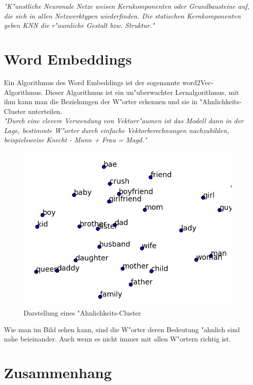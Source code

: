 \textit{"K"unstliche Neuronale Netze weisen Kernkomponenten oder Grundbausteine auf, die sich in allen Netzwerktypen wiederfinden. Die statischen Kernkomponenten geben KNN die r"aumliche Gestalt bzw. Struktur."}
\cite{Strecker97}


\section{Word Embeddings}
Ein Algorithmus des Word Embeddings ist der sogenannte word2Vec-Algorithmus. Dieser Algorithmus ist ein un"uberwachter Lernalgorithmus, mit ihm kann man die Beziehungen der W"orter erkennen und sie in "Ahnlichkeits-Cluster unterteilen.\\
\textit{"Durch eine clevere Verwendung von Vektorr"aumen ist das Modell dann in der Lage, bestimmte W"orter durch einfache Vektorberechnungen nachzubilden, beispielsweise Knecht - Mann + Frau = Magd."}
\cite{raschka:2017}
\begin{figure}[bth]
\includegraphics[width=15cm]{Graphics/cluster.png}\caption["Ahnlichkeits-Cluster]{Darstellung eines "Ahnlichkeits-Cluster  \cite{marivate:2017}}
\end{figure}

Wie man im Bild sehen kann, sind die W"orter deren Bedeutung "ahnlich sind nahe beieinander. Auch wenn es nicht immer mit allen W"ortern richtig ist. 

\section{Zusammenhang}


